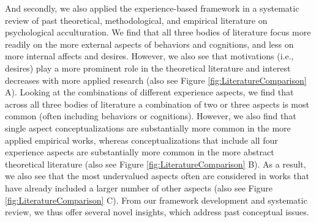 \documentclass[man, 12pt, a4paper, mask]{apa7}
\begin{document}
And secondly, we also applied the experience-based framework in a systematic review of past theoretical, methodological, and empirical literature on psychological acculturation. We find that all three bodies of literature focus more readily on the more external aspects of behaviors and cognitions, and less on more internal affects and desires. However, we also see that motivations (i.e., desires) play a more prominent role in the theoretical literature and interest decreases with more applied research (also see Figure \ref{fig:LiteratureComparison} A). Looking at the combinations of different experience aspects, we find that across all three bodies of literature a combination of two or three aspects is most common (often including behaviors or cognitions). However, we also find that single aspect conceptualizations are substantially more common in the more applied empirical works, whereas conceptualizations that include all four experience aspects are substantially more common in the more abstract theoretical literature (also see Figure \ref{fig:LiteratureComparison} B). As a result, we also see that the most undervalued aspects often are considered in works that have already included a larger number of other aspects (also see Figure 
\ref{fig:LiteratureComparison} C). 
From our framework development and systematic review, we thus offer several novel insights, which address past conceptual issues.
\end{document}
